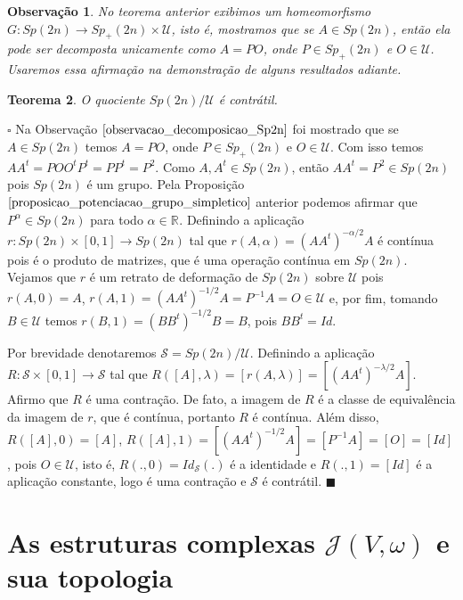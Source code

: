 \documentclass[12pt]{book}
\newtheorem{teorema}{Teorema}[section]
\newtheorem{observacao}[teorema]{Observação}
\newenvironment{prova}[1]{$\square$ #1}{\hfill$\blacksquare$}
\newcommand{\estruturacomplexapadrao}{\mathcal{J}(V, \omega)}
\newcommand{\gruposimpletico}[1]{Sp(#1)}
\newcommand{\gruposimpleticopositivo}[1]{Sp_{+}(#1)}
\newcommand{\real}[1]{\mathbb{R}^{#1}}
\begin{document}
	\begin{observacao}\label{observacao_decomposicao_Sp2n}
		No teorema anterior exibimos um homeomorfismo $G:\gruposimpletico{2n} \to \gruposimpleticopositivo{2n} \times \mathcal{U}$, isto é, mostramos que se $A \in \gruposimpletico{2n}$, então ela pode ser decomposta unicamente como $A=PO$, onde $P\in \gruposimpleticopositivo{2n}$ e $O \in \mathcal{U}$. Usaremos essa afirmação na demonstração de alguns resultados adiante.
	\end{observacao}
	
	\begin{teorema}
		O quociente $\gruposimpletico{2n}/\mathcal{U}$ é contrátil.
	\end{teorema}
	\begin{prova}
		Na Observação $\ref{observacao_decomposicao_Sp2n}$ foi mostrado que se $A \in \gruposimpletico{2n}$ temos $A=PO$, onde $P \in \gruposimpleticopositivo{2n}$ e $O \in \mathcal{U}$. Com isso temos $AA^{t} = POO^{t}P^{t} = PP^{t}=P^{2}$. Como $A,A^{t} \in \gruposimpletico{2n}$, então $AA^{t} =P^{2} \in \gruposimpletico{2n}$ pois $\gruposimpletico{2n}$ é um grupo. Pela Proposição $\ref{proposicao_potenciacao_grupo_simpletico}$ anterior podemos afirmar que $P^{\alpha} \in \gruposimpletico{2n}$ para todo $\alpha \in \real{}$. Definindo a aplicação $r:\gruposimpletico{2n}\times [0,1] \to \gruposimpletico{2n}$ tal que $r(A, \alpha) = (AA^{t})^{-\alpha/2}A$ é contínua pois é o produto de matrizes, que é uma operação contínua em $\gruposimpletico{2n}$. Vejamos que $r$ é um retrato de deformação de $\gruposimpletico{2n}$ sobre $\mathcal{U}$ pois $r(A, 0) = A$, $r(A, 1) = (AA^{t})^{-1/2}A = P^{-1}A = O \in \mathcal{U}$ e, por fim, tomando $B \in \mathcal{U}$ temos $r(B, 1) = (BB^{t})^{-1/2}B = B$, pois $BB^{t} = Id$.
		
		Por brevidade denotaremos $\mathcal{S} = \gruposimpletico{2n}/\mathcal{U}$. Definindo a aplicação $R:\mathcal{S} \times [0,1] \to \mathcal{S}$ tal que $R([A], \lambda) = [r(A, \lambda)] = [(AA^{t})^{-\lambda/2}A]$. Afirmo que $R$ é uma contração. De fato, a imagem de $R$ é a classe de equivalência da imagem de $r$, que é contínua, portanto $R$ é contínua. Além disso, $R([A], 0) = [A]$, $R([A], 1) = [(AA^{t})^{-1/2}A] = [P^{-1}A] = [O] = [Id]$, pois $O \in \mathcal{U}$, isto é, $R(., 0) = Id_{\mathcal{S}}(.)$ é a identidade e $R(., 1) = [Id]$ é a aplicação constante, logo é uma contração e $\mathcal{S}$ é contrátil.
	\end{prova}
	
	\section{As estruturas complexas $\estruturacomplexapadrao$ e sua topologia}
	
\end{document}
